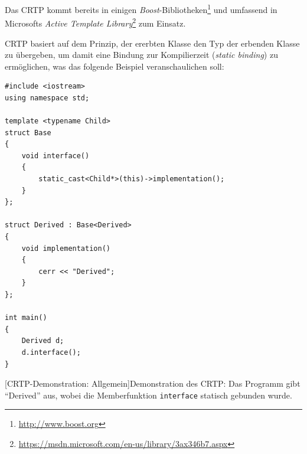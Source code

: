 Das CRTP kommt bereits in einigen \textit{Boost}-Bibliotheken\footnote{\url{http://www.boost.org}} und umfassend in Microsofts \textit{Active Template Library}\footnote{\url{https://msdn.microsoft.com/en-us/library/3ax346b7.aspx}} zum Einsatz.

CRTP basiert auf dem Prinzip, der ererbten Klasse den Typ der erbenden Klasse zu übergeben, um damit eine Bindung zur Kompilierzeit (\textit{static binding}) zu ermöglichen, was das folgende Beispiel veranschaulichen soll:
\begin{center}
\begin{verbatim}
#include <iostream>
using namespace std;

template <typename Child>
struct Base
{
    void interface()
    {
        static_cast<Child*>(this)->implementation();
    }
};

struct Derived : Base<Derived>
{
    void implementation()
    {
        cerr << "Derived";
    }
};

int main()
{
    Derived d;
    d.interface();
}
\end{verbatim}
[CRTP-Demonstration: Allgemein]{Demonstration des CRTP: Das Programm gibt ``Derived'' aus, wobei die Memberfunktion \texttt{interface} statisch gebunden wurde.}
\label{lst:crtp-generic}
\end{center}

\bigskip

